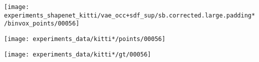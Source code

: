 \begin{minipage}[t]{0.1\textwidth}
    \vspace{0px}
    \centering
    \texttt{[image: experiments\_shapenet\_kitti/vae\_occ+sdf\_sup/sb.corrected.large.padding*/binvox\_points/00056]}
\end{minipage}
\begin{minipage}[t]{0.1\textwidth}
    \vspace{0px}
    \centering
    \texttt{[image: experiments\_data/kitti*/points/00056]}
\end{minipage}
\begin{minipage}[t]{0.1\textwidth}
    \vspace{0px}
    \centering
    \texttt{[image: experiments\_data/kitti*/gt/00056]}
\end{minipage}